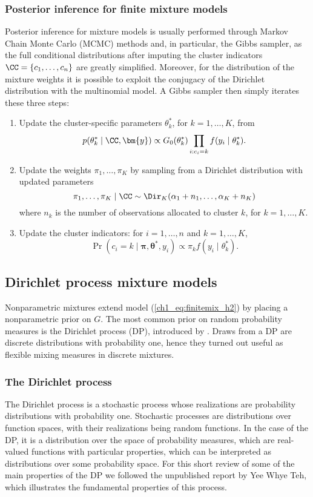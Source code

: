 \subsubsection*{Posterior inference for finite mixture models}
Posterior inference for mixture models is usually performed through Markov Chain Monte Carlo (MCMC) methods and, in particular, the Gibbs sampler, as the full conditional distributions after imputing the cluster indicators $\CC = \{c_1,\dots,c_n\}$ are greatly simplified.
Moreover, for the distribution of the mixture weights it is possible to exploit the conjugacy of the Dirichlet distribution with the multinomial model. A Gibbs sampler then simply iterates these three steps:
\begin{enumerate}
	\item Update the cluster-specific parameters $\theta^*_k$, for $k=1,\dots,K$, from
	$$ p(\theta^*_k \mid \CC, \bm{y}) \propto G_0(\theta^*_k) \prod_{i:c_i=k} f(y_i\mid\theta^*_{k}). $$
	\item Update the weights $\pi_1,\dots,\pi_K$ by sampling from a Dirichlet distribution with updated parameters
	$$ \pi_1,\dots,\pi_K\mid \CC \sim  \Dir_K(\alpha_1 + n_1,\dots,\alpha_K + n_K) $$
	where $n_k$ is the number of observations allocated to cluster $k$, for $k=1,\dots,K$.
	\item Update the cluster indicators: for $i=1,\dots,n$ and $k=1,\dots,K$,
	$$ \Pr(c_i = k\mid \bm{\pi},\bm{\theta}^*, y_i) \propto \pi_k f(y_i\mid\theta^*_{k})  .$$
\end{enumerate}



\subsection{Dirichlet process mixture models}
Nonparametric mixtures extend model (\ref{ch1_eq:finitemix_h2}) by placing a nonparametric prior on $G$. The most common prior on random probability measures is the Dirichlet process (DP), introduced by \textcite{ferguson1973, ferguson1974}. Draws from a DP are discrete distributions with probability one, hence they turned out useful as flexible mixing measures in discrete mixtures.

\subsubsection*{The Dirichlet process }
\label{ch1_sec:DP}
The Dirichlet process is a stochastic process whose realizations are probability distributions with probability one. 
Stochastic processes are distributions over function spaces, with their realizations being random functions. In the case of the DP, it is a distribution over the space of probability measures, which are real-valued functions with particular properties, which can be interpreted as distributions over some probability space. For this short review of some of the main properties of the DP we followed the unpublished report by Yee Whye Teh, which illustrates the fundamental properties of this process.

